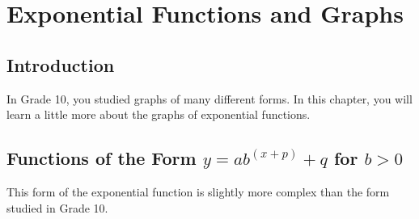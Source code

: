 \chapter{Exponential Functions and Graphs}
\label{m:fg:e11}

\section{Introduction}
In Grade 10, you studied graphs of many different forms. In this chapter, you will learn a little more about the graphs of exponential functions.



\section{Functions of the Form $y=ab^{(x+p)} + q$ for $b> 0$}
This form of the exponential function is slightly more complex than the form studied in Grade 10.

